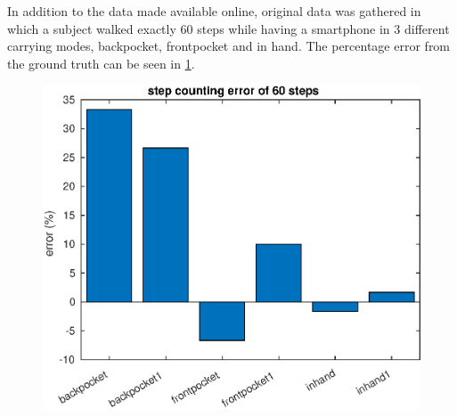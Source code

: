 In addition to the data made available online, original data was gathered in which a subject walked exactly 60 steps while having a smartphone in 3 different carrying modes, backpocket, frontpocket and in hand. The percentage error from the ground truth can be seen in \cref{fig:202009291013step_counting_error_of_60_steps}.
\begin{figure}[H]
	\centering
	\includegraphics[width=0.6\linewidth]{images/20200929_1013_step_counting_error_of_60_steps}
	\caption{}
	\label{fig:202009291013step_counting_error_of_60_steps}
\end{figure}

